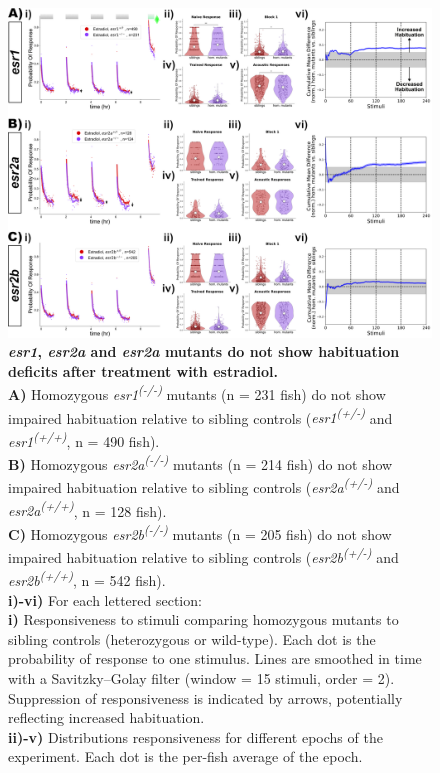 \documentclass[10pt,lineno]{RandlettLab_elife}
\begin{document}
{\begin{figure}
\begin{fullwidth}
\begin{center}
\includegraphics[width=0.8\linewidth]{figures/NuclearSingleMutants.png}
\caption{\textbf{\emph{esr1}, \emph{esr2a} and \emph{esr2a} mutants do not show habituation deficits after treatment with estradiol.} \scriptsize
\\ \textbf{A)} Homozygous \emph{esr1\textsuperscript{(-/-)}} mutants (n = 231 fish) do not show impaired habituation relative to sibling controls (\emph{esr1\textsuperscript{(+/-)}} and \emph{esr1\textsuperscript{(+/+)}}, n = 490 fish). 
\\ \textbf{B)} Homozygous \emph{esr2a\textsuperscript{(-/-)}} mutants (n = 214 fish) do not show impaired habituation relative to sibling controls (\emph{esr2a\textsuperscript{(+/-)}} and \emph{esr2a\textsuperscript{(+/+)}}, n = 128 fish).
\\ \textbf{C)} Homozygous \emph{esr2b\textsuperscript{(-/-)}} mutants (n = 205 fish) do not show impaired habituation relative to sibling controls (\emph{esr2b\textsuperscript{(+/-)}} and \emph{esr2b\textsuperscript{(+/+)}}, n = 542 fish). 
\\ \textbf{i)-vi)} For each lettered section: 
\\ \textbf{i)} Responsiveness to stimuli comparing homozygous mutants to sibling controls (heterozygous or wild-type). 
Each dot is the probability of response to one stimulus. Lines are smoothed in time with a Savitzky–Golay filter (window = 15 stimuli, order = 2). 
Suppression of responsiveness is indicated by arrows, potentially reflecting increased habituation.
\\ \textbf{ii)-v)} Distributions responsiveness for different epochs of the experiment. Each dot is the per-fish average of the epoch. 
}
\end{center}
\end{fullwidth}
\end{figure}}
\end{document}

